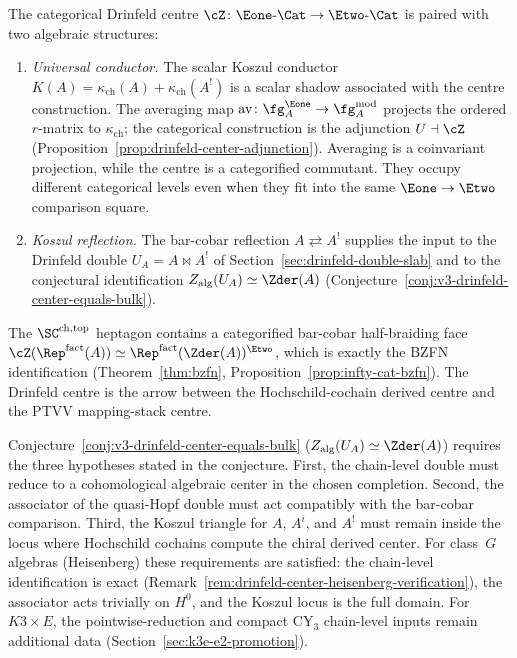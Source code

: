 \begin{remark}
\label{rem:drinfeld-vol1-anchors}
The categorical Drinfeld centre
$\cZ \colon \Eone\text{-}\Cat \to \Etwo\text{-}\Cat$
is paired with two algebraic structures:
\begin{enumerate}[label=(\roman*)]
 \item \emph{Universal conductor.} The scalar Koszul conductor
 $K(A) = \kappa_{\mathrm{ch}}(A) + \kappa_{\mathrm{ch}}(A^!)$ is a
 scalar shadow associated with the centre construction. The averaging
 map $\mathrm{av} \colon \fg^{\Eone}_A \to \fg^{\mathrm{mod}}_A$
 projects the ordered $r$-matrix to $\kappa_{\mathrm{ch}}$; the
 categorical construction is the adjunction $U \dashv \cZ$
 (Proposition~\ref{prop:drinfeld-center-adjunction}). Averaging is a
 coinvariant projection, while the centre is a categorified commutant.
 They occupy different categorical levels even when they fit into the
 same $\Eone \to \Etwo$ comparison square.
 \item \emph{Koszul reflection.} The bar-cobar reflection
 $A \rightleftarrows A^!$ supplies the input to the Drinfeld double
 $U_A = A \bowtie A^!$ of Section~\ref{sec:drinfeld-double-slab} and
 to the conjectural identification
 $Z_{\mathrm{alg}}(U_A) \simeq \Zder(A)$
 (Conjecture~\ref{conj:v3-drinfeld-center-equals-bulk}).
\end{enumerate}
\end{remark}

\begin{remark}
\label{rem:drinfeld-vol2-anchor}
The $\SC^{\mathrm{ch,top}}$ heptagon contains a categorified
bar-cobar half-braiding face
$\cZ(\Rep^{\mathrm{fact}}(A)) \simeq
\Rep^{\mathrm{fact}}(\Zder(A))^{\Etwo}$, which is exactly the BZFN
identification (Theorem~\ref{thm:bzfn},
Proposition~\ref{prop:infty-cat-bzfn}). The Drinfeld centre is the
arrow between the Hochschild-cochain derived centre and the PTVV
mapping-stack centre.
\end{remark}

\begin{remark}
\label{rem:drinfeld-provenance-summary}
Conjecture~\ref{conj:v3-drinfeld-center-equals-bulk}
($Z_{\mathrm{alg}}(U_A) \simeq \Zder(A)$) requires the three
hypotheses stated in the conjecture. First, the chain-level double
must reduce to a cohomological algebraic center in the chosen
completion. Second, the associator of the quasi-Hopf double must act
compatibly with the bar-cobar comparison. Third, the Koszul triangle
for $A$, $A^i$, and $A^!$ must remain inside the locus where
Hochschild cochains compute the chiral derived center. For class~$G$
algebras (Heisenberg) these requirements are satisfied: the
chain-level identification is exact
(Remark~\ref{rem:drinfeld-center-heisenberg-verification}), the
associator acts trivially on $H^0$, and the Koszul locus is the full
domain. For $K3 \times E$, the pointwise-reduction and compact
CY$_3$ chain-level inputs remain additional data
(Section~\ref{sec:k3e-e2-promotion}).
\end{remark}
